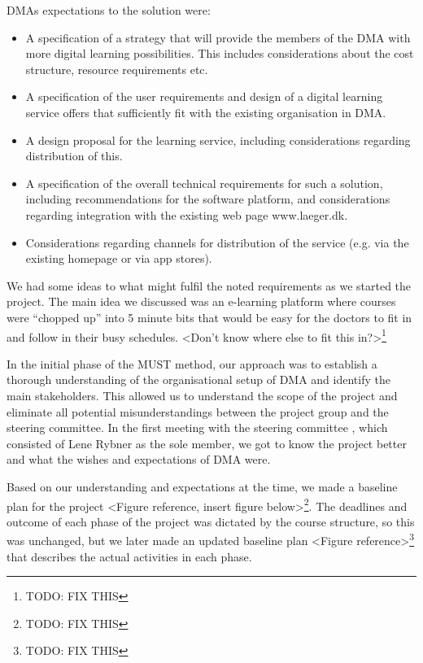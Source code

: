 DMAs expectations to the solution were:

\begin{itemize}
\item A specification of a strategy that will provide the members of the DMA with more digital learning possibilities. This includes considerations about the cost structure, resource requirements etc.
\item A specification of the user requirements and design of a digital learning service offers that sufficiently fit with the existing organisation in DMA.
\item A design proposal for the learning service, including considerations regarding distribution of this.
\item A specification of the overall technical requirements for such a solution, including recommendations for the software platform, and considerations regarding integration with the existing web page www.laeger.dk.
\item Considerations regarding channels for distribution of the service (e.g. via the existing homepage or via app stores).
\end{itemize}

We had some ideas to what might fulfil the noted requirements as we started the project. The main idea we discussed was an e-learning platform where courses were “chopped up” into 5 minute bits that would be easy for the doctors to fit in and follow in their busy schedules. <Don’t know where else to fit this in?>\footnote{TODO: FIX THIS}

In the initial phase of the MUST method, our approach was to establish a thorough understanding of the organisational setup of DMA and identify the main stakeholders. This allowed us to understand the scope of the project and eliminate all potential misunderstandings between the project group and the steering committee. In the first meeting with the steering committee , which consisted of Lene Rybner as the sole member, we got to know the project better and what the wishes and expectations of DMA were.

Based on our understanding and expectations at the time, we made a baseline plan for the project <Figure reference, insert figure below>\footnote{TODO: FIX THIS}. The deadlines and outcome of each phase of the project was dictated by the course structure, so this was unchanged, but we later made an updated baseline plan <Figure reference>\footnote{TODO: FIX THIS} that describes the actual activities in each phase.


